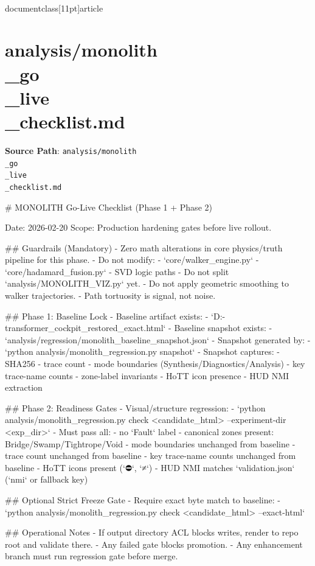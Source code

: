 \\documentclass[11pt]{article}
\begin{document}
\section*{analysis/monolith\\_go\\_live\\_checklist.md}
\textbf{Source Path}: \texttt{analysis/monolith\\_go\\_live\\_checklist.md}\par
\bigskip
\begin{CodeBlock}
# MONOLITH Go-Live Checklist (Phase 1 + Phase 2)

Date: 2026-02-20  
Scope: Production hardening gates before live rollout.

## Guardrails (Mandatory)
- Zero math alterations in core physics/truth pipeline for this phase.
- Do not modify:
  - `core/walker_engine.py`
  - `core/hadamard_fusion.py`
  - SVD logic paths
- Do not split `analysis/MONOLITH_VIZ.py` yet.
- Do not apply geometric smoothing to walker trajectories.
  - Path tortuosity is signal, not noise.

## Phase 1: Baseline Lock
- Baseline artifact exists:
  - `D:\belief-transformer\monolith_cockpit_restored_exact.html`
- Baseline snapshot exists:
  - `analysis/regression/monolith_baseline_snapshot.json`
- Snapshot generated by:
  - `python analysis/monolith_regression.py snapshot`
- Snapshot captures:
  - SHA256
  - trace count
  - mode boundaries (Synthesis/Diagnostics/Analysis)
  - key trace-name counts
  - zone-label invariants
  - HoTT icon presence
  - HUD NMI extraction

## Phase 2: Readiness Gates
- Visual/structure regression:
  - `python analysis/monolith_regression.py check <candidate_html> --experiment-dir <exp_dir>`
- Must pass all:
  - no `Fault` label
  - canonical zones present: Bridge/Swamp/Tightrope/Void
  - mode boundaries unchanged from baseline
  - trace count unchanged from baseline
  - key trace-name counts unchanged from baseline
  - HoTT icons present (`⛔`, `≠`)
  - HUD NMI matches `validation.json` (`nmi` or fallback key)

## Optional Strict Freeze Gate
- Require exact byte match to baseline:
  - `python analysis/monolith_regression.py check <candidate_html> --exact-html`

## Operational Notes
- If output directory ACL blocks writes, render to repo root and validate there.
- Any failed gate blocks promotion.
- Any enhancement branch must run regression gate before merge.


\end{CodeBlock}
\end{document}
